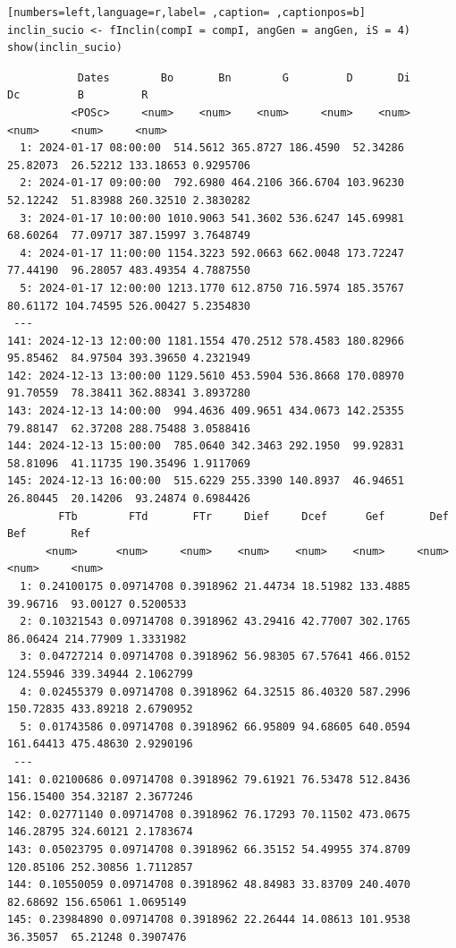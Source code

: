 \begin{itemize}
\begin{lstlisting}[numbers=left,language=r,label= ,caption= ,captionpos=b]
inclin_sucio <- fInclin(compI = compI, angGen = angGen, iS = 4)
show(inclin_sucio)
\end{lstlisting}

\begin{verbatim}
		   Dates        Bo       Bn        G         D       Di        Dc         B         R
		  <POSc>     <num>    <num>    <num>     <num>    <num>     <num>     <num>     <num>
  1: 2024-01-17 08:00:00  514.5612 365.8727 186.4590  52.34286 25.82073  26.52212 133.18653 0.9295706
  2: 2024-01-17 09:00:00  792.6980 464.2106 366.6704 103.96230 52.12242  51.83988 260.32510 2.3830282
  3: 2024-01-17 10:00:00 1010.9063 541.3602 536.6247 145.69981 68.60264  77.09717 387.15997 3.7648749
  4: 2024-01-17 11:00:00 1154.3223 592.0663 662.0048 173.72247 77.44190  96.28057 483.49354 4.7887550
  5: 2024-01-17 12:00:00 1213.1770 612.8750 716.5974 185.35767 80.61172 104.74595 526.00427 5.2354830
 ---                                                                                                 
141: 2024-12-13 12:00:00 1181.1554 470.2512 578.4583 180.82966 95.85462  84.97504 393.39650 4.2321949
142: 2024-12-13 13:00:00 1129.5610 453.5904 536.8668 170.08970 91.70559  78.38411 362.88341 3.8937280
143: 2024-12-13 14:00:00  994.4636 409.9651 434.0673 142.25355 79.88147  62.37208 288.75488 3.0588416
144: 2024-12-13 15:00:00  785.0640 342.3463 292.1950  99.92831 58.81096  41.11735 190.35496 1.9117069
145: 2024-12-13 16:00:00  515.6229 255.3390 140.8937  46.94651 26.80445  20.14206  93.24874 0.6984426
	    FTb        FTd       FTr     Dief     Dcef      Gef       Def       Bef       Ref
	  <num>      <num>     <num>    <num>    <num>    <num>     <num>     <num>     <num>
  1: 0.24100175 0.09714708 0.3918962 21.44734 18.51982 133.4885  39.96716  93.00127 0.5200533
  2: 0.10321543 0.09714708 0.3918962 43.29416 42.77007 302.1765  86.06424 214.77909 1.3331982
  3: 0.04727214 0.09714708 0.3918962 56.98305 67.57641 466.0152 124.55946 339.34944 2.1062799
  4: 0.02455379 0.09714708 0.3918962 64.32515 86.40320 587.2996 150.72835 433.89218 2.6790952
  5: 0.01743586 0.09714708 0.3918962 66.95809 94.68605 640.0594 161.64413 475.48630 2.9290196
 ---                                                                                         
141: 0.02100686 0.09714708 0.3918962 79.61921 76.53478 512.8436 156.15400 354.32187 2.3677246
142: 0.02771140 0.09714708 0.3918962 76.17293 70.11502 473.0675 146.28795 324.60121 2.1783674
143: 0.05023795 0.09714708 0.3918962 66.35152 54.49955 374.8709 120.85106 252.30856 1.7112857
144: 0.10550059 0.09714708 0.3918962 48.84983 33.83709 240.4070  82.68692 156.65061 1.0695149
145: 0.23984890 0.09714708 0.3918962 22.26444 14.08613 101.9538  36.35057  65.21248 0.3907476
\end{verbatim}


\end{itemize}
